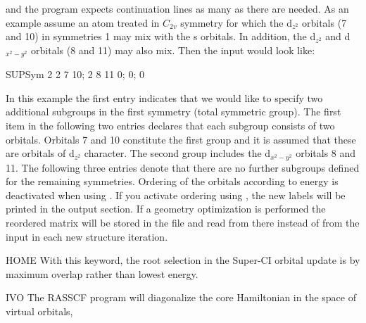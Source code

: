 \begin{keywordlist}
and the program expects continuation lines as many as there are needed.
As an example assume an atom treated in $C_{2v}$ symmetry for
which the d$_{z^2}$ orbitals (7 and 10) in symmetries 1 may mix with the
s orbitals. In addition, the d$_{z^2}$ and d$_{x^2-y^2}$ orbitals  (8 and 11)
may also mix. Then the input would look like:
\begin{inputlisting}
SUPSym
2
   2 7 10; 2 8 11
0; 0; 0
\end{inputlisting}
In this example the first entry indicates that we would like to specify
two additional subgroups in the first symmetry (total symmetric group). The
first item in the following two entries declares that each subgroup consists
of two orbitals. Orbitals 7 and 10 constitute the first group and it is
assumed that these are orbitals of d$_{z^2}$ character. The second group
includes the d$_{x^2-y^2}$ orbitals 8 and 11. The following three entries
denote that there are no further subgroups defined for the remaining
symmetries. Ordering of the orbitals according to energy is deactivated
when using . If you activate ordering using ,
the new labels will be printed in the output section.
If a geometry optimization is performed the reordered matrix will be stored
in the  file and read from there instead of from the input
in each new structure iteration.
\item[HOME]
With this keyword, the root selection in the Super-CI orbital update
is by maximum overlap rather than lowest energy.
\item[IVO]
The RASSCF program will diagonalize the core Hamiltonian in the space of virtual orbitals, 

\end{keywordlist}
